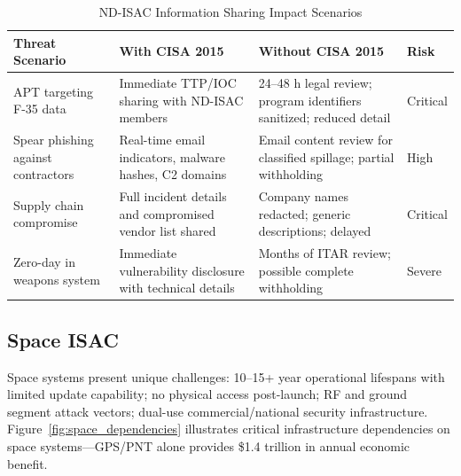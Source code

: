 \documentclass[journal]{IEEEtran}
\begin{document}
\begin{table}[!t]
\caption{ND-ISAC Information Sharing Impact Scenarios}
\centering\small
\begin{tabular}{@{}p{3.2cm}p{4.5cm}p{4.5cm}p{1.8cm}@{}}
\toprule
\textbf{Threat Scenario} & \textbf{With CISA 2015} & \textbf{Without CISA 2015} & \textbf{Risk} \\
\midrule
APT targeting F-35 data & Immediate TTP/IOC sharing with ND-ISAC members & 24--48 h legal review; program identifiers sanitized; reduced detail & Critical \\
Spear phishing against contractors & Real-time email indicators, malware hashes, C2 domains & Email content review for classified spillage; partial withholding & High \\
Supply chain compromise & Full incident details and compromised vendor list shared & Company names redacted; generic descriptions; delayed & Critical \\
Zero-day in weapons system & Immediate vulnerability disclosure with technical details & Months of ITAR review; possible complete withholding & Severe \\
\bottomrule
\end{tabular}
\label{tab:nd_scenarios}
\end{table}

\subsection{Space ISAC}

Space systems present unique challenges: 10--15+ year operational lifespans with limited update capability; no physical access post-launch; RF and ground segment attack vectors; dual-use commercial/national security infrastructure. Figure~\ref{fig:space_dependencies} illustrates critical infrastructure dependencies on space systems---GPS/PNT alone provides \$1.4 trillion in annual economic benefit.
\end{document}
